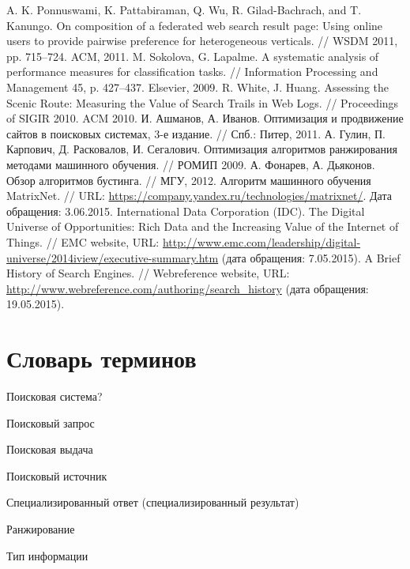 \documentclass[12pt,a4paper]{report}
\begin{document}
\begin{thebibliography}{@}
   A. K. Ponnuswami, K. Pattabiraman, Q. Wu,
R. Gilad-Bachrach, and T. Kanungo. On composition of a federated web search result page: Using online users to provide pairwise preference for heterogeneous verticals. //  WSDM 2011, pp. 715–724. ACM, 2011.
   M. Sokolova, G. Lapalme. A systematic analysis of performance measures for classification tasks. // Information Processing and Management 45, p. 427–437. Elsevier, 2009.
   R. White, J. Huang. Assessing the Scenic Route: Measuring the Value of Search Trails in Web Logs. // Proceedings of SIGIR 2010. ACM 2010.    
 И. Ашманов, А. Иванов. Оптимизация и продвижение сайтов в поисковых системах, 3-е издание. // Спб.: Питер, 2011.
   А. Гулин, П. Карпович, Д. Расковалов,
И. Сегалович. Оптимизация алгоритмов ранжирования методами машинного обучения. // РОМИП 2009.
   А. Фонарев, А. Дьяконов. Обзор алгоритмов бустинга. // МГУ, 2012.
   Алгоритм машинного обучения MatrixNet. // URL: \url{https://company.yandex.ru/technologies/matrixnet/}. Дата обращения: 3.06.2015.               
 International Data Corporation (IDC). The Digital Universe of Opportunities: Rich Data and the Increasing Value of the Internet of Things. // EMC website,
  URL: \url{http://www.emc.com/leadership/digital-universe/2014iview/executive-summary.htm} (дата обращения: 7.05.2015).
 A Brief History of Search Engines. // Webreference website, 
  URL: \url{http://www.webreference.com/authoring/search_history} (дата обращения: 19.05.2015).

\end{thebibliography}

\chapter*{Словарь терминов}

Поисковая система?

Поисковый запрос

Поисковая выдача


Поисковый источник

Специализированный ответ (специализированный результат)

Ранжирование

Тип информации
\end{document}

